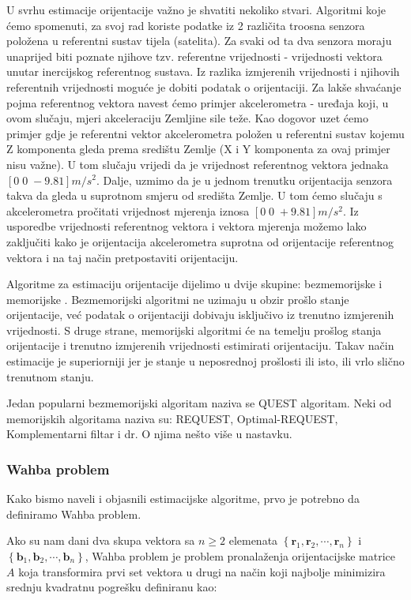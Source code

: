 \documentclass[times, utf8, diplomski, numeric]{templates/template}
\begin{document}
{{{            U svrhu estimacije orijentacije važno je shvatiti nekoliko stvari. Algoritmi koje ćemo spomenuti, za svoj rad koriste podatke iz 2 različita troosna senzora položena u referentni sustav tijela (satelita). Za svaki od ta dva senzora moraju unaprijed biti poznate njihove tzv. referentne vrijednosti - vrijednosti vektora unutar inercijskog referentnog sustava. Iz razlika izmjerenih vrijednosti i njihovih referentnih vrijednosti moguće je dobiti podatak o orijentaciji. Za lakše shvaćanje pojma referentnog vektora navest ćemo primjer akcelerometra - uređaja koji, u ovom slučaju, mjeri akceleraciju Zemljine sile teže. Kao dogovor uzet ćemo primjer gdje je referentni vektor akcelerometra položen u referentni sustav kojemu Z komponenta gleda prema središtu Zemlje (X i Y komponenta za ovaj primjer nisu važne). U tom slučaju vrijedi da je vrijednost referentnog vektora jednaka $\left[0 \; 0 \; -9.81\right] m/s^2$. Dalje, uzmimo da je u jednom trenutku orijentacija senzora takva da gleda u suprotnom smjeru od središta Zemlje. U tom ćemo slučaju s akcelerometra pročitati vrijednost mjerenja iznosa $\left[0 \; 0 \; +9.81\right] m/s^2$. Iz usporedbe vrijednosti referentnog vektora i vektora mjerenja možemo lako zaključiti kako je orijentacija akcelerometra suprotna od orijentacije referentnog vektora i na taj način pretpostaviti orijentaciju.

            Algoritme za estimaciju orijentacije dijelimo u dvije skupine: bezmemorijske i memorijske \cite{uvod_u_svemirske}. Bezmemorijski algoritmi ne uzimaju u obzir prošlo stanje orijentacije, već podatak o orijentaciji dobivaju isključivo iz trenutno izmjerenih vrijednosti. S druge strane, memorijski algoritmi će na temelju prošlog stanja orijentacije i trenutno izmjerenih vrijednosti estimirati orijentaciju. Takav način estimacije je superiorniji jer je stanje u neposrednoj prošlosti ili isto, ili vrlo slično trenutnom stanju. 

            Jedan popularni bezmemorijski algoritam naziva se QUEST algoritam. Neki od memorijskih algoritama naziva su: REQUEST, Optimal-REQUEST, Komplementarni filtar i dr. O njima nešto više u nastavku. 

            \subsubsection{Wahba problem}{
                Kako bismo naveli i objasnili estimacijske algoritme, prvo je potrebno da definiramo Wahba problem. 

                Ako su nam dani dva skupa vektora sa $n\ge2$ elemenata $\left\{ \boldsymbol{r}_1, \boldsymbol{r}_2, \cdots , \boldsymbol{r}_n \right\}$ i $\left\{ \boldsymbol{b}_1, \boldsymbol{b}_2, \cdots , \boldsymbol{b}_n \right\}$, Wahba problem je problem pronalaženja orijentacijske matrice $A$ koja transformira prvi set vektora u drugi na način koji najbolje minimizira srednju kvadratnu pogrešku definiranu kao:

}}}}
\end{document}
